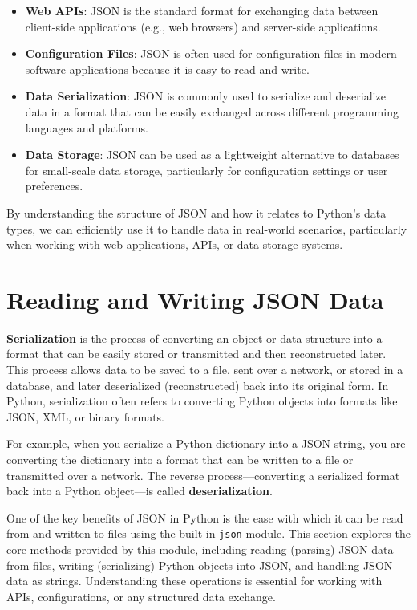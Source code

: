 \documentclass[
  letterpaper,
  DIV=11,
  numbers=noendperiod]{scrreprt}
\providecommand{\tightlist}{%
  \setlength{\itemsep}{0pt}\setlength{\parskip}{0pt}}\usepackage{longtable,booktabs,array}
\begin{document}
\begin{itemize}
\tightlist
\item
  \textbf{Web APIs}: JSON is the standard format for exchanging data
  between client-side applications (e.g., web browsers) and server-side
  applications.
\item
  \textbf{Configuration Files}: JSON is often used for configuration
  files in modern software applications because it is easy to read and
  write.
\item
  \textbf{Data Serialization}: JSON is commonly used to serialize and
  deserialize data in a format that can be easily exchanged across
  different programming languages and platforms.
\item
  \textbf{Data Storage}: JSON can be used as a lightweight alternative
  to databases for small-scale data storage, particularly for
  configuration settings or user preferences.
\end{itemize}

By understanding the structure of JSON and how it relates to Python's
data types, we can efficiently use it to handle data in real-world
scenarios, particularly when working with web applications, APIs, or
data storage systems.

\hypertarget{reading-and-writing-json-data}{%
\section{Reading and Writing JSON
Data}\label{reading-and-writing-json-data}}

\textbf{Serialization} is the process of converting an object or data
structure into a format that can be easily stored or transmitted and
then reconstructed later. This process allows data to be saved to a
file, sent over a network, or stored in a database, and later
deserialized (reconstructed) back into its original form. In Python,
serialization often refers to converting Python objects into formats
like JSON, XML, or binary formats.

For example, when you serialize a Python dictionary into a JSON string,
you are converting the dictionary into a format that can be written to a
file or transmitted over a network. The reverse process---converting a
serialized format back into a Python object---is called
\textbf{deserialization}.

One of the key benefits of JSON in Python is the ease with which it can
be read from and written to files using the built-in \texttt{json}
module. This section explores the core methods provided by this module,
including reading (parsing) JSON data from files, writing (serializing)
Python objects into JSON, and handling JSON data as strings.
Understanding these operations is essential for working with APIs,
configurations, or any structured data exchange.
\end{document}
